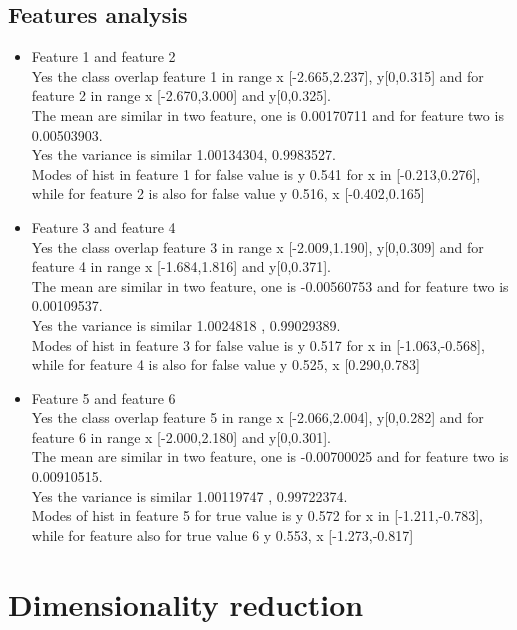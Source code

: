 \documentclass{article}
\begin{document}
\subsection{Features analysis}

\begin{itemize}
    \item Feature 1 and feature 2\\
        Yes the class overlap feature 1 in range x [-2.665,2.237], y[0,0.315] and for feature 2 in range x [-2.670,3.000] and y[0,0.325].\\
        The mean are similar in two feature, one is 0.00170711 and for feature two is 0.00503903.\\
        Yes the variance is similar 1.00134304, 0.9983527.\\
        Modes of hist in feature 1 for false value is y 0.541 for x in [-0.213,0.276], while for feature 2 is also for false value y 0.516, x [-0.402,0.165]\\
    \item Feature 3 and feature 4\\
         Yes the class overlap feature 3 in range x [-2.009,1.190], y[0,0.309] and for feature 4 in range x [-1.684,1.816] and y[0,0.371].\\
         The mean are similar in two feature, one is -0.00560753 and for feature two is 0.00109537.\\
        Yes the variance is similar 1.0024818 , 0.99029389.\\
        Modes of hist in feature 3 for false value is y 0.517 for x in [-1.063,-0.568], while for feature 4 is also for false value y 0.525, x [0.290,0.783]\\
    \item Feature 5 and feature 6\\
         Yes the class overlap feature 5 in range x [-2.066,2.004], y[0,0.282] and for feature 6 in range x [-2.000,2.180] and y[0,0.301].\\
         The mean are similar in two feature, one is -0.00700025 and for feature two is 0.00910515.\\
        Yes the variance is similar 1.00119747 , 0.99722374.\\
        Modes of hist in feature 5 for true value is y 0.572 for x in [-1.211,-0.783], while for feature also for true value 6 y 0.553, x [-1.273,-0.817]\\
\end{itemize}

\section{Dimensionality reduction}
\end{document}

